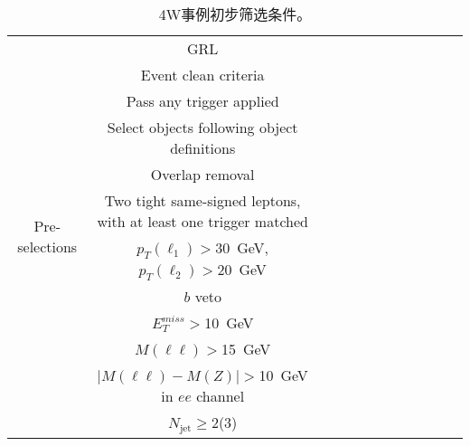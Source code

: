 \begin{table}
\centering
\small
\begin{tabular}{c|ccccccccccc}
\hline
\hline
\multirow{12}{2cm}{Pre-selections} &GRL \\
                                  &Event clean criteria\\
                                  &Pass any trigger applied \\
                                  &Select objects following object definitions\\
                                  &Overlap removal \\
                                  &Two tight same-signed leptons, with at least one trigger matched \\
                                  &$p_T(\ell_1) >30$~GeV, $p_T(\ell_2)>20$~GeV \\
                                  &$b$ veto \\
                                  &$E_T^{miss}>$10~GeV \\
                                  &$M(\ell\ell)>$15~GeV \\
                                  &$|M(\ell\ell)-M(Z)|>$10~GeV in $ee$ channel\\
                                  &$N_\text{jet}\geq$2(3) \\
\hline
\hline
\end{tabular}
\caption{4W事例初步筛选条件。}
\label{tab:4w_evt_presel}
\end{table}
